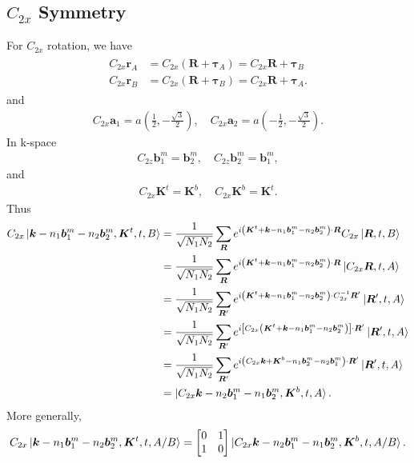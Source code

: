 \documentclass[10pt, oneside]{article}
\newcommand{\p}[1]{\left(#1\right)}
\newcommand{\bb}[1]{\left[#1\right]}
\begin{document}
\subsection{$C_{2 x}$ Symmetry}
For \(C_{2x}\) rotation, we have 
\begin{align}
	\begin{split}
		C_{2x} \bm{r}_{A} &= C_{2x} \p{\bm{R} + \bm{\tau}_{A}} = C_{2x} \bm{R} + \bm{\tau}_{B} \\
		C_{2x} \bm{r}_{B} &= C_{2x} \p{\bm{R} + \bm{\tau}_{B}} = C_{2x} \bm{R} + \bm{\tau}_{A}.
	\end{split}
\end{align} 
and 
\begin{align}
	C_{2x} \bm{a}_{1} = a \p{\frac{1}{2}, -\frac{\sqrt{3}}{2}},\quad C_{2x} \bm{a}_{2} = a \p{-\frac{1}{2}, -\frac{\sqrt{3}}{2}}.
\end{align}
In k-space
\begin{align}
	C_{2z} \bm{b}^{m}_{1} = \bm{b}^{m}_{2}, \quad C_{2z} \bm{b}^{m}_{2} = \bm{b}^{m}_{1},
\end{align}
and 
\begin{align}
	C_{2x} \bm{K}^{t} = \bm{K}^{b} ,\quad C_{2x} \bm{K}^{b} = \bm{K}^{t}.
\end{align}
Thus 
\begin{align}
	\begin{split}
		C_{2x} \ket{\bm{k} -n_{1} \bm{b}^{m}_{1} - n_{2} \bm{b}^{m}_{2}, \bm{K}^{t}, t, B} & = \frac{1}{\sqrt{N_1 N_{2}}} \sum_{\bm{R}} e^{i \p{\bm{K}^{t} + \bm{k} - n_{1} \bm{b}^{m}_{1} - n_{2} \bm{b}^{m}_{2}} \cdot \bm{R} } C_{2x} \ket{\bm{R}, t, B} \\
		& = \frac{1}{\sqrt{N_1 N_{2}}} \sum_{\bm{R}} e^{i \p{\bm{K}^{t} + \bm{k} - n_{1} \bm{b}^{m}_{1} - n_{2} \bm{b}^{m}_{2}} \cdot \bm{R} }  \ket{C_{2x} \bm{R}, t, A} \\ 
		& = \frac{1}{\sqrt{N_1 N_{2}}} \sum_{\bm{R}^\prime} e^{i \p{\bm{K}^{t} + \bm{k} - n_{1} \bm{b}^{m}_{1} - n_{2} \bm{b}^{m}_{2}} \cdot C^{-1}_{2x}\bm{R}^\prime }  \ket{ \bm{R}^\prime, t, A} \\
		& = \frac{1}{\sqrt{N_1 N_{2}}} \sum_{\bm{R}^\prime} e^{i  \bb{C_{2x} \p{\bm{K}^{t} + \bm{k} - n_{1} \bm{b}^{m}_{1} - n_{2} \bm{b}^{m}_{2}}} \cdot \bm{R}^\prime }  \ket{ \bm{R}^\prime, t, A} \\
		& = \frac{1}{\sqrt{N_1 N_{2}}} \sum_{\bm{R}^\prime} e^{i \p{C_{2x} \bm{k} + \bm{K}^{b} - n_{1} \bm{b}^{m}_{2} - n_{2} \bm{b}^{m}_{1}} \cdot \bm{R}^\prime }  \ket{ \bm{R}^\prime, t, A} \\
		& = \ket{C_{2x} \bm{k}- n_{2} \bm{b}^{m}_{1} - n_{1} \bm{b}^{m}_{2} , \bm{K}^{b}, t, A}.
	\end{split}
\end{align}
More generally,
\begin{align}
	C_{2x} \ket{\bm{k} -n_{1} \bm{b}^{m}_{1} - n_{2} \bm{b}^{m}_{2}, \bm{K}^{t}, t, A/B} = \begin{bmatrix}
		0 & 1 \\
		1 & 0
	\end{bmatrix} \ket{C_{2x} \bm{k}- n_{2} \bm{b}^{m}_{1} - n_{1} \bm{b}^{m}_{2} , \bm{K}^{b}, t, A/B }.
\end{align}
\end{document}
